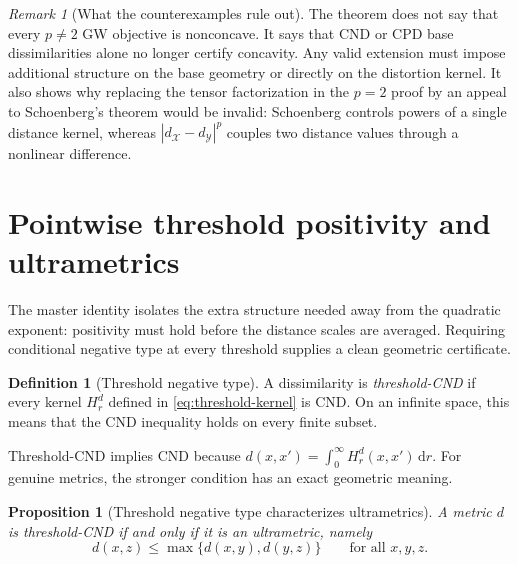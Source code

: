 \documentclass[11pt,a4paper]{article}
\newtheorem{proposition}[theorem]{Proposition}
\theoremstyle{definition}
\newtheorem{definition}[theorem]{Definition}
\theoremstyle{remark}
\newtheorem{remark}[theorem]{Remark}
\newcommand{\dd}{\,\mathrm d}
\newcommand{\abs}[1]{\left\lvert #1\right\rvert}
\begin{document}
\begin{remark}[What the counterexamples rule out]
The theorem does not say that every \(p\neq2\) GW objective is nonconcave.  It
says that CND or CPD base dissimilarities alone no longer certify concavity.
Any valid extension must impose additional structure on the base geometry or
directly on the distortion kernel.  It also shows why replacing the tensor
factorization in the \(p=2\) proof by an appeal to Schoenberg's theorem would
be invalid: Schoenberg controls powers of a single distance kernel, whereas
\(\abs{d_{\mathcal X}-d_{\mathcal Y}}^p\) couples two distance values through
a nonlinear difference.
\end{remark}

\section{Pointwise threshold positivity and ultrametrics}
\label{sec:thresholds}

The master identity isolates the extra structure needed away from the
quadratic exponent: positivity must hold before the distance scales are
averaged.  Requiring conditional negative type at every threshold supplies a
clean geometric certificate.

\begin{definition}[Threshold negative type]
\label{def:threshold-cnd}
A dissimilarity is \emph{threshold-CND} if every kernel \(H_r^d\) defined in
\eqref{eq:threshold-kernel} is CND.  On an infinite space, this means that the
CND inequality holds on every finite subset.
\end{definition}

Threshold-CND implies CND because
\(d(x,x')=\int_0^\infty H_r^d(x,x')\dd r\).  For genuine metrics, the stronger
condition has an exact geometric meaning.

\begin{proposition}[Threshold negative type characterizes ultrametrics]
\label{prop:threshold-ultrametric}
A metric \(d\) is threshold-CND if and only if it is an ultrametric, namely
\begin{equation}
  d(x,z)\leq\max\{d(x,y),d(y,z)\}
  \qquad\text{for all }x,y,z.
  \label{eq:ultrametric-inequality}
\end{equation}
\end{proposition}
\end{document}
